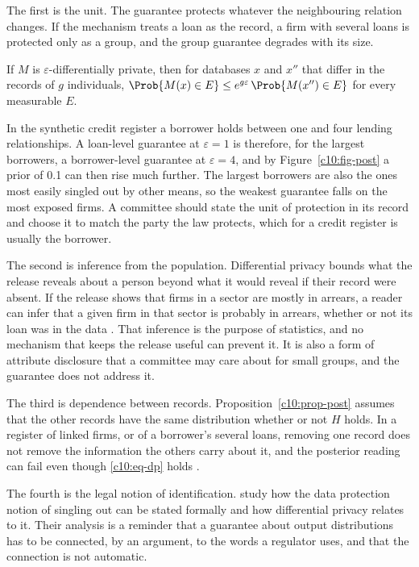 The first is the unit. The guarantee protects whatever the neighbouring relation
changes. If the mechanism treats a loan as the record, a firm with several loans is
protected only as a group, and the group guarantee degrades with its size.

\begin{proposition}[Groups]\label{c10:prop-group}
If $M$ is $\varepsilon$-differentially private, then for databases $x$ and $x''$
that differ in the records of $g$ individuals,
$\Prob\{M(x) \in E\} \le e^{g\varepsilon}\,\Prob\{M(x'') \in E\}$ for every
measurable $E$.
\end{proposition}

In the synthetic credit register a borrower holds between one and four lending
relationships.
A loan-level guarantee at $\varepsilon = 1$ is therefore, for the largest
borrowers, a borrower-level guarantee at $\varepsilon = 4$, and by
Figure~\ref{c10:fig-post} a prior of 0.1 can then rise much further. The
largest borrowers are also the ones most easily singled out by other means, so the
weakest guarantee falls on the most exposed firms. A committee should state the
unit of protection in its record and choose it to match the party the law
protects, which for a credit register is usually the borrower.

The second is inference from the population. Differential privacy bounds what the
release reveals about a person beyond what it would reveal if their record were
absent. If the release shows that firms in a sector are mostly in arrears, a reader
can infer that a given firm in that sector is probably in arrears, whether or not
its loan was in the data \citep{dwork2014}. That inference is the purpose of
statistics, and no mechanism that keeps the release useful can prevent it. It is
also a form of attribute disclosure that a committee may care about for small
groups, and the guarantee does not address it.

The third is dependence between records. Proposition~\ref{c10:prop-post} assumes
that the other records have the same distribution whether or not $H$ holds. In a
register of linked firms, or of a borrower's several loans, removing one record
does not remove the information the others carry about it, and the posterior
reading can fail even though \eqref{c10:eq-dp} holds \citep{kifer2011}.

The fourth is the legal notion of identification. \citet{cohen2020} study how the
data protection notion of singling out can be stated formally and how
differential privacy relates to it. Their analysis is a reminder that a
guarantee about output distributions has to be connected, by an argument, to the
words a regulator uses, and that the connection is not automatic.

